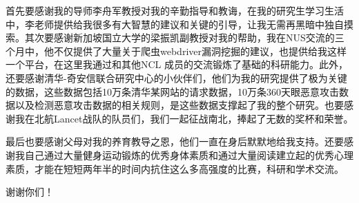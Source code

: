 \documentclass[doctor,privacy,twoside]{buaa_mac}
\begin{document}
\acknowledgments

首先要感谢我的导师李舟军教授对我的辛勤指导和教诲，在我的研究生学习生活中，李老师提供给我很多有大智慧的建议和关键的引导，让我无需再黑暗中独自摸索。其次要感谢新加坡国立大学的梁振凯副教授对我的帮助，我在NUS交流的三个月中，他不仅提供了大量关于爬虫webdriver漏洞挖掘的建议，也提供给我这样一个平台，在这里我通过和其他NCL 成员的交流锻炼了基础的科研能力。此外，还要感谢清华-奇安信联合研究中心的小伙伴们，他们为我的研究提供了极为关键的数据，这些数据包括10万条清华某网站的请求数据，10万条360天眼恶意攻击数据以及检测恶意攻击数据的相关规则，是这些数据支撑起了我的整个研究。也要感谢我在北航Lancet战队的队员们，我们一起征战南北，捧起了无数的奖杯和荣誉。

最后也要感谢父母对我的养育教导之恩，他们一直在身后默默地给我支持。还要感谢我自己通过大量健身运动锻炼的优秀身体素质和通过大量阅读建立起的优秀心理素质，才能在短短两年半的时间内抗住这么多高强度的比赛，科研和学术交流。

谢谢你们！


%

%

\vspace{5cm}
\end{document}
